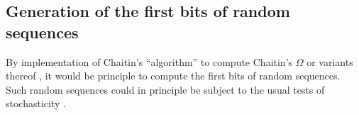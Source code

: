 \begin{Karl}
\subsection{Generation of the first bits of  random sequences}
By implementation of Chaitin's ``algorithm'' to compute
Chaitin's $\Omega$  \cite{chaitin:01}
or variants thereof \cite{calude:94}, it would be principle to compute the first bits
of random sequences.
Such random sequences could in principle be subject to the usual
tests of stochasticity \cite{svozil-qct,nbstandards-test}.
\end{Karl}




